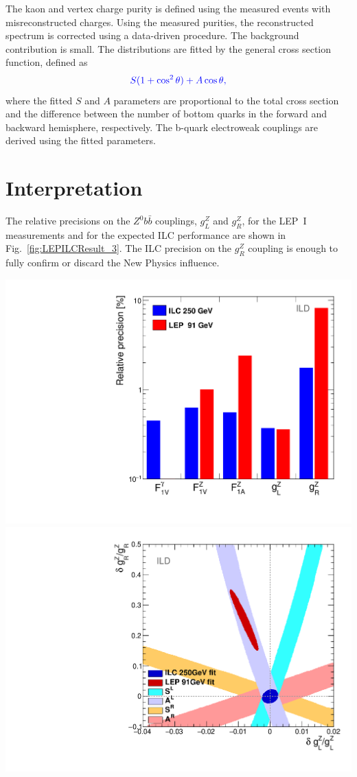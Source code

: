 The kaon and vertex charge purity is defined using the measured events with misreconstructed charges. Using the measured purities, the reconstructed spectrum is corrected using a data-driven procedure.
The background contribution is small. 
The distributions are fitted by the general cross section function, defined as 
\begin{equation}
{\color{Blue}	S (1+\cos^2\theta) + A \cos\theta,}
\end{equation}
where the fitted $S$ and $A$ parameters are proportional to the total cross section and the difference between the number of bottom quarks in the forward and backward hemisphere, respectively. 
The b-quark electroweak couplings are derived using the fitted parameters. 
\section*{Interpretation}

The relative precisions on the $Z^0b\bar{b}$ couplings, $g_L^Z$ and $g_R^Z$, for the LEP~I measurements and for the expected ILC performance are shown in Fig.~\ref{fig:LEPILCResult_3}. The ILC precision on the $g_R^Z$ coupling is enough to fully confirm or discard the New Physics influence. 
\begin{center}\vspace{1cm}

	\includegraphics[width=0.4\linewidth]{plots/final-graph-ild.pdf}
	\includegraphics[width=0.4\linewidth]{plots/ilc-precision-ild.pdf}
		\label{fig:LEPILCResult_3}
\end{center}\vspace{1cm}


